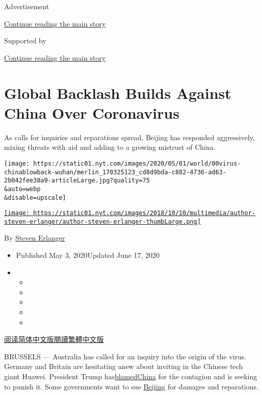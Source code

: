 Advertisement

\protect\hyperlink{after-top}{Continue reading the main story}

Supported by

\protect\hyperlink{after-sponsor}{Continue reading the main story}

\hypertarget{global-backlash-builds-against-china-over-coronavirus}{%
\section{Global Backlash Builds Against China Over
Coronavirus}\label{global-backlash-builds-against-china-over-coronavirus}}

As calls for inquiries and reparations spread, Beijing has responded
aggressively, mixing threats with aid and adding to a growing mistrust
of China.

\texttt{[image: https://static01.nyt.com/images/2020/05/01/world/00virus-chinablowback-wuhan/merlin\_170325123\_cd8d9bda-c882-4736-ad63-2b042fee38a9-articleLarge.jpg?quality=75\\\&auto=webp\\\&disable=upscale]}

\href{https://www.nytimes.com/by/steven-erlanger}{\texttt{[image: https://static01.nyt.com/images/2018/10/10/multimedia/author-steven-erlanger/author-steven-erlanger-thumbLarge.png]}}

By \href{https://www.nytimes.com/by/steven-erlanger}{Steven Erlanger}

\begin{itemize}
\item
  Published May 3, 2020Updated June 17, 2020
\item
  \begin{itemize}
  \item
  \item
  \item
  \item
  \item
  \end{itemize}
\end{itemize}

\href{https://cn.nytimes.com/world/20200506/backlash-china-coronavirus/}{阅读简体中文版}\href{https://cn.nytimes.com/world/20200506/backlash-china-coronavirus/zh-hant/}{閱讀繁體中文版}

BRUSSELS --- Australia has called for an inquiry into the origin of the
virus. Germany and Britain are hesitating anew about inviting in the
Chinese tech giant Huawei. President Trump
has\href{https://www.nytimes.com/2020/04/30/us/politics/trump-administration-intelligence-coronavirus-china.html?action=click\&module=Spotlight\&pgtype=Homepage}{blamed}\href{https://www.nytimes.com/2020/05/21/business/economy/coronavirus-china-economy.html}{China}
for the contagion and is seeking to punish it. Some governments want to
sue
\href{https://www.nytimes.com/2020/06/19/world/asia/coronavirus-china-beijing.html}{Beijing}
for damages and reparations.


